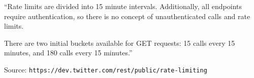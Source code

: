 ``Rate limits are divided into 15 minute intervals. Additionally, all endpoints require authentication, so there is no concept of unauthenticated calls and rate limits.

There are two initial buckets available for GET requests: 15 calls every 15 minutes, and 180 calls every 15 minutes.''

Source: \verb|https://dev.twitter.com/rest/public/rate-limiting|

\\



